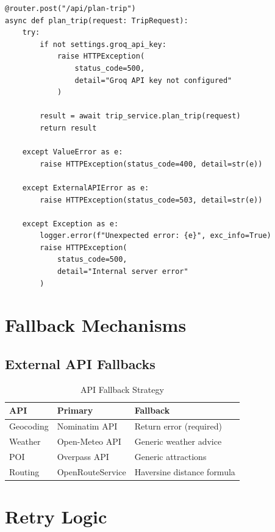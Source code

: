 \documentclass[12pt,a4paper]{report}
\begin{document}
\begin{lstlisting}[style=pythonstyle, caption={Backend Error Handler}]
@router.post("/api/plan-trip")
async def plan_trip(request: TripRequest):
    try:
        if not settings.groq_api_key:
            raise HTTPException(
                status_code=500,
                detail="Groq API key not configured"
            )
        
        result = await trip_service.plan_trip(request)
        return result
    
    except ValueError as e:
        raise HTTPException(status_code=400, detail=str(e))
    
    except ExternalAPIError as e:
        raise HTTPException(status_code=503, detail=str(e))
    
    except Exception as e:
        logger.error(f"Unexpected error: {e}", exc_info=True)
        raise HTTPException(
            status_code=500,
            detail="Internal server error"
        )
\end{lstlisting}

\section{Fallback Mechanisms}

\subsection{External API Fallbacks}

\begin{table}[H]
\centering
\begin{tabular}{|l|l|p{6cm}|}
\hline
\textbf{API} & \textbf{Primary} & \textbf{Fallback} \\
\hline
Geocoding & Nominatim API & Return error (required) \\
\hline
Weather & Open-Meteo API & Generic weather advice \\
\hline
POI & Overpass API & Generic attractions \\
\hline
Routing & OpenRouteService & Haversine distance formula \\
\hline
\end{tabular}
\caption{API Fallback Strategy}
\label{tab:api-fallbacks}
\end{table}

\section{Retry Logic}
\end{document}
